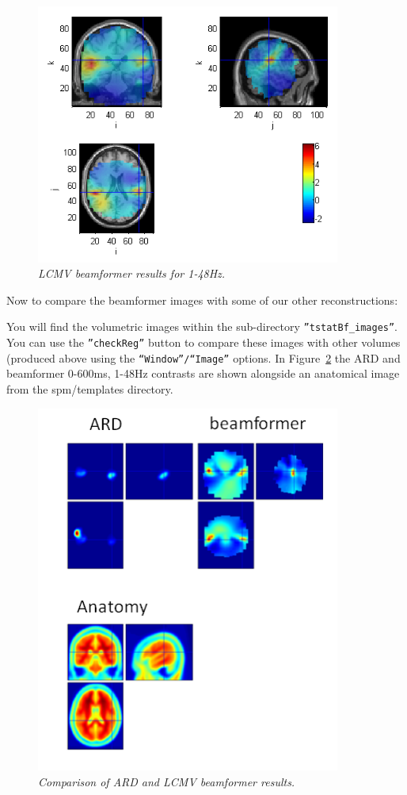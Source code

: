 \begin{figure}
\begin{center}
\includegraphics[width=100mm]{meg_sloc/Slide11}
\caption{\em LCMV beamformer results for 1-48Hz.\label{meg_sloc:fig:11}}
\end{center}
\end{figure}

Now to compare the beamformer images with some of our other reconstructions:

You will find the volumetric images within the sub-directory \texttt{''tstatBf\_images''}. You can use the \texttt{''checkReg''} button to compare these images with other volumes (produced above using the \texttt{``Window''/``Image''} options. In Figure~\ref{meg_sloc:fig:12} the ARD and beamformer 0-600ms, 1-48Hz contrasts are shown alongside an anatomical image from the spm/templates directory.

\begin{figure}
\begin{center}
\includegraphics[width=100mm]{meg_sloc/Slide12}
\caption{\em Comparison of ARD and LCMV beamformer results.\label{meg_sloc:fig:12}}
\end{center}
\end{figure}

